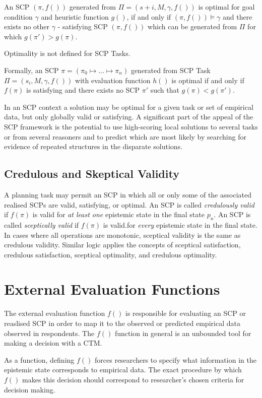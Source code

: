 An SCP $(\pi,f())$ generated from  $\Pi=(s+i, M, \gamma, f())$ is optimal for goal condition $\gamma$ and heuristic function $g()$, if and only if $(\pi,f()) \models \gamma$ and there exists no other $\gamma$ - satisfying SCP $(\pi,f())$ which can be generated from $\Pi$ for which $g(\pi')>g(\pi)$.

Optimality is not defined for SCP Tasks.

Formally, an SCP $\pi=(\pi_0 \longmapsto ... \longmapsto \pi_n)$ generated from SCP Task $\Pi=(s_i, M, \gamma, f())$ with evaluation function $h()$ is optimal if and only if $f(\pi)$ is satisfying and there exists no SCP $\pi'$ such that $g(\pi)<g(\pi')$.

In an SCP context a solution may be optimal for a given task or set of empirical data, but only globally valid or satisfying. A significant part of the appeal of the SCP framework is the potential to use high-scoring local solutions to several tasks or from several reasoners and to predict which are most likely by searching for evidence of repeated structures in the disparate solutions.
\subsection{Credulous and Skeptical Validity}

A planning task may permit an SCP in which all or only some of the associated realised SCPs are valid, satisfying, or optimal. An SCP is called \textit{credulously valid} if $f(\pi)$ is valid for \textit{at least one} epistemic state in the final state $p_n$. An SCP is called \textit{sceptically valid} if $f(\pi)$ is valid.for \textit{every} epistemic state in the final state. In cases where all operations are monotonic, sceptical validity is the same as credulous validity. Similar logic applies the concepts of sceptical satisfaction, credulous satisfaction, sceptical optimality, and credulous optimality.




\section{External Evaluation Functions}\label{ssec:f}
The external evaluation function $f()$ is responsible for evaluating an SCP or reaslised SCP in order to map it to the observed or predicted empirical data observed in respondents. The $f()$ function in general is an unbounded tool for making a decision with a CTM.

As a function, defining $f()$ forces researchers to specify what information in the epistemic state corresponds to empirical data. The exact procedure by which $f()$ makes this decision should correspond to researcher's chosen criteria for decision making.

